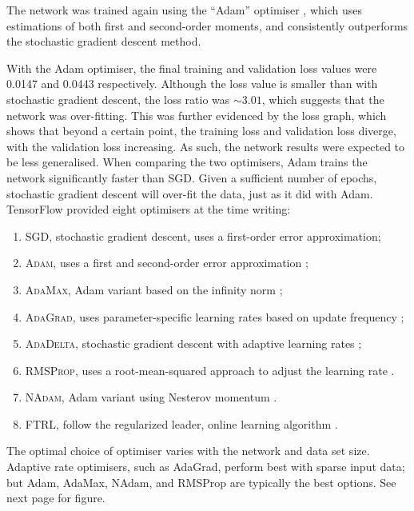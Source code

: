 The network was trained again using the ``Adam'' optimiser
\citep{Kingma:2014:Adam}, which uses estimations of both first and second-order
moments, and consistently outperforms the stochastic gradient descent method.

With the Adam optimiser, the final training and validation loss values were
0.0147 and 0.0443 respectively.
Although the loss value is smaller than with stochastic gradient descent, the
loss ratio was $\sim3.01$, which suggests that the network was over-fitting.
This was further evidenced by the loss graph, which shows that beyond a certain
point, the training loss and validation loss diverge, with the validation loss
increasing.
As such, the network results were expected to be less generalised.
When comparing the two optimisers, Adam trains the network significantly faster
than SGD.
Given a sufficient number of epochs, stochastic gradient descent will over-fit
the data, just as it did with Adam.
\newpage\noindent
TensorFlow provided eight optimisers at the time writing:
\begin{enumerate}

    \item\textsc{SGD}, stochastic gradient descent, uses a first-order error
        approximation;

    \item\textsc{Adam}, uses a first and second-order error approximation
        \citep{Kingma:2014:Adam};

    \item\textsc{AdaMax}, Adam variant based on the infinity norm
        \citep{Kingma:2014:Adam};

    \item\textsc{AdaGrad}, uses parameter-specific learning rates based on
        update frequency \citep{Duchi:2011:Adagrad};

    \item\textsc{AdaDelta}, stochastic gradient descent with adaptive learning
        rates \citep{Zeiler:2012:Adadelta};

    \item\textsc{RMSProp}, uses a root-mean-squared approach to adjust the
        learning rate \citep{Hinton:2014:RMSProp}.

    \item\textsc{NAdam}, Adam variant using Nesterov momentum
        \citep{Dozat:2016:NAdam}.

    \item\textsc{FTRL}, follow the regularized leader, online learning
        algorithm \citep{McMahan:2013:FTRL}.

\end{enumerate}
The optimal choice of optimiser varies with the network and data set size.
Adaptive rate optimisers, such as AdaGrad, perform best with sparse input data;
but Adam, AdaMax, NAdam, and RMSProp are typically the best options.
See next page for figure.

